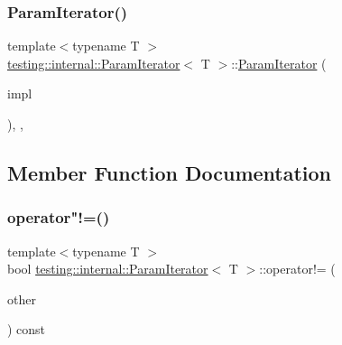 \mbox{\label{classtesting_1_1internal_1_1ParamIterator_acf5ad898e7f50eb82a6c367889aa07c4}} 
\subsubsection{\texorpdfstring{Param\+Iterator()}{ParamIterator()}\hspace{0.1cm}{\footnotesize\ttfamily [2/2]}}
{\footnotesize\ttfamily template$<$typename T $>$ \\
\hyperlink{classtesting_1_1internal_1_1ParamIterator}{testing\+::internal\+::\+Param\+Iterator}$<$ T $>$\+::\hyperlink{classtesting_1_1internal_1_1ParamIterator}{Param\+Iterator} (\begin{DoxyParamCaption}\item[{\hyperlink{classtesting_1_1internal_1_1ParamIteratorInterface}{Param\+Iterator\+Interface}$<$ T $>$ $\ast$}]{impl }\end{DoxyParamCaption})\hspace{0.3cm}{\ttfamily [inline]}, {\ttfamily [explicit]}, {\ttfamily [private]}}



\subsection{Member Function Documentation}
\mbox{\label{classtesting_1_1internal_1_1ParamIterator_a7a6aee04e8e44b5c8294929951cfac2b}} 
\subsubsection{\texorpdfstring{operator"!=()}{operator!=()}}
{\footnotesize\ttfamily template$<$typename T $>$ \\
bool \hyperlink{classtesting_1_1internal_1_1ParamIterator}{testing\+::internal\+::\+Param\+Iterator}$<$ T $>$\+::operator!= (\begin{DoxyParamCaption}\item[{const \hyperlink{classtesting_1_1internal_1_1ParamIterator}{Param\+Iterator}$<$ T $>$ \&}]{other }\end{DoxyParamCaption}) const\hspace{0.3cm}{\ttfamily [inline]}}

